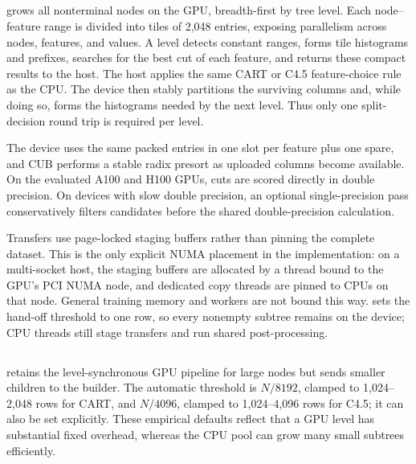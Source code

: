 \subsection{\ImplGpu}

\ImplGpu{} grows all nonterminal nodes on the GPU, breadth-first by tree level. Each node--feature range is divided into tiles of 2,048 entries, exposing parallelism across nodes, features, and values.  A level detects constant ranges, forms tile histograms and prefixes, searches for the best cut of each feature, and returns these compact results to the host.  The host applies the same CART or C4.5 feature-choice rule as the CPU.  The device then stably partitions the surviving columns and, while doing so, forms the histograms needed by the next level.  Thus only one split-decision round trip is required per level.

The device uses the same packed entries in one slot per feature plus one spare, and CUB performs a stable radix presort as uploaded columns become available. On the evaluated A100 and H100 GPUs, cuts are scored directly in double precision.  On devices with slow double precision, an optional single-precision pass conservatively filters candidates before the shared double-precision calculation.

Transfers use page-locked staging buffers rather than pinning the complete dataset.  This is the only explicit NUMA placement in the implementation: on a multi-socket host, the staging buffers are allocated by a thread bound to the GPU's PCI NUMA node, and dedicated copy threads are pinned to CPUs on that node.  General training memory and workers are not bound this way. \ImplGpu{} sets the hand-off threshold to one row, so every nonempty subtree remains on the device; CPU threads still stage transfers and run shared post-processing.

\subsection{\ImplHybrid}

\ImplHybrid{} retains the level-synchronous GPU pipeline for large nodes but sends smaller children to the \ImplParallel{} builder.  The automatic threshold is \(N/8192\), clamped to 1,024--2,048 rows for CART, and \(N/4096\), clamped to 1,024--4,096 rows for C4.5; it can also be set explicitly.  These empirical defaults reflect that a GPU level has substantial fixed overhead, whereas the CPU pool can grow many small subtrees efficiently.

